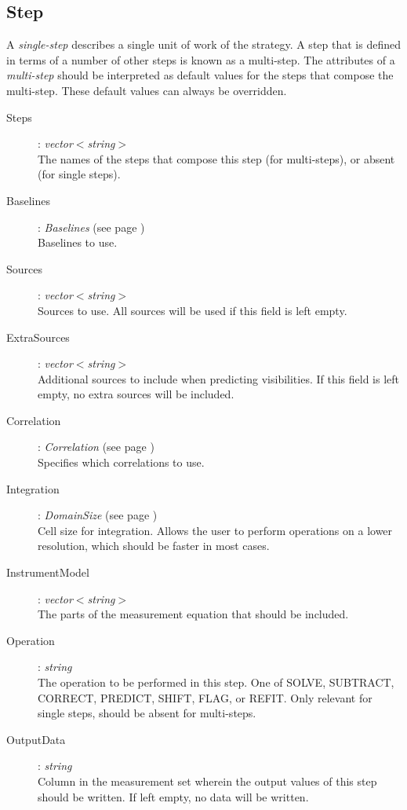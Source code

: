 \documentclass[10pt]{lofar}
\begin{document}
\subsection*{Step}
A \emph{single-step} describes a single unit of work of the strategy. A step
that is defined in terms of a number of other steps is known as a multi-step.
The attributes of a \emph{multi-step} should be interpreted as default values
for the steps that compose the multi-step. These default values can always be
overridden.
\begin{description}
\item [Steps] : \emph{vector$<$string$>$} \\
    The names of the steps that compose this step (for multi-steps), or absent
    (for single steps).
\item [Baselines] : \emph{Baselines} (see page \pageref{app-baselines}) \\
    Baselines to use.
\item [Sources] : \emph{vector$<$string$>$} \\
    Sources to use. All sources will be used if this field is left empty.
\item [ExtraSources] : \emph{vector$<$string$>$} \\
    Additional sources to include when predicting visibilities. If this field
    is left empty, no extra sources will be included.
\item [Correlation] : \emph{Correlation}  (see page \pageref{app-correlation}) \\
    Specifies which correlations to use.
\item [Integration] : \emph{DomainSize}  (see page \pageref{app-domainsize}) \\
    Cell size for integration. Allows the user to perform operations on a
    lower resolution, which should be faster in most cases.
\item [InstrumentModel] : \emph{vector$<$string$>$} \\
    The parts of the measurement equation that should be included. \par
\item [Operation] : \emph{string} \\
    The operation to be performed in this step. One of SOLVE, SUBTRACT, CORRECT,
    PREDICT, SHIFT, FLAG, or REFIT. Only relevant for single steps, should be
    absent for multi-steps.
\item [OutputData] : \emph{string} \\
    Column in the measurement set wherein the output values of this step
    should be written. If left empty, no data will be written.
\end{description}
\end{document}
